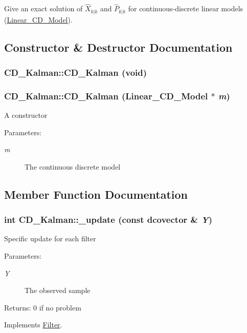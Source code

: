 Give an exact solution of $ \hat{X}_{k|k}$ and $ \hat{P}_{k|k} $ for continuous-discrete linear models (\hyperlink{class_linear___c_d___model}{Linear\_\-CD\_\-Model}). 

\subsection{Constructor \& Destructor Documentation}
\hypertarget{class_c_d___kalman_d5d85ce755d9353740f4b9ffdf63455f}{
\subsubsection[{CD\_\-Kalman}]{\setlength{\rightskip}{0pt plus 5cm}CD\_\-Kalman::CD\_\-Kalman (void)}}
\label{class_c_d___kalman_d5d85ce755d9353740f4b9ffdf63455f}


\hypertarget{class_c_d___kalman_0fd0cf5d85f0b5a820d2269bea6de350}{
\subsubsection[{CD\_\-Kalman}]{\setlength{\rightskip}{0pt plus 5cm}CD\_\-Kalman::CD\_\-Kalman ({\bf Linear\_\-CD\_\-Model} $\ast$ {\em m})}}
\label{class_c_d___kalman_0fd0cf5d85f0b5a820d2269bea6de350}


A constructor

\begin{Desc}
\item[Parameters:]
\begin{description}
\item[{\em m}]The continuous discrete model \end{description}
\end{Desc}


\subsection{Member Function Documentation}
\hypertarget{class_c_d___kalman_ecef658eac67b1005d9e86ec30708300}{
\subsubsection[{\_\-update}]{\setlength{\rightskip}{0pt plus 5cm}int CD\_\-Kalman::\_\-update (const dcovector \& {\em Y})}}
\label{class_c_d___kalman_ecef658eac67b1005d9e86ec30708300}


Specific update for each filter

\begin{Desc}
\item[Parameters:]
\begin{description}
\item[{\em Y}]The observed sample\end{description}
\end{Desc}
\begin{Desc}
\item[Returns:]0 if no problem \end{Desc}


Implements \hyperlink{class_filter_20ecd17fed3b8f11a76c960fe5e7144b}{Filter}.